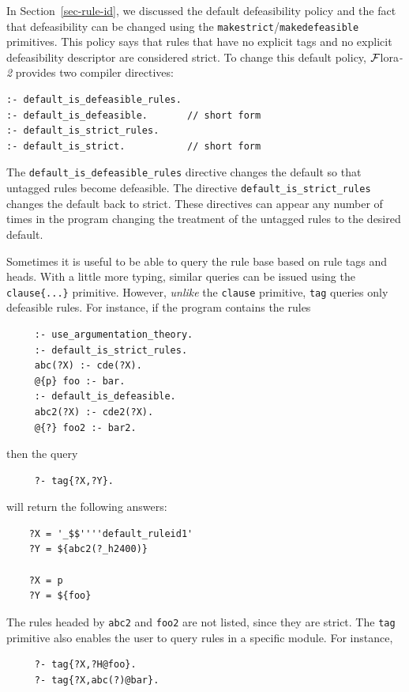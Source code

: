\documentclass[11pt]{article}
\newcommand{\FLORA}{{\mbox{\sc ${\cal F}${lora}\rm\emph{-2}}}\xspace}
\begin{document}
In Section~\ref{sec-rule-id}, we discussed the default
defeasibility policy and the fact that defeasibility can be changed using
the \texttt{makestrict}/\texttt{makedefeasible} primitives.  
This policy says that rules that have no explicit tags and no explicit
defeasibility descriptor are considered strict. To change this default
policy, \FLORA provides two compiler directives:
\begin{verbatim}
:- default_is_defeasible_rules.
:- default_is_defeasible.       // short form
:- default_is_strict_rules.
:- default_is_strict.           // short form
\end{verbatim}
The \verb|default_is_defeasible_rules| directive changes the default so
that untagged rules become defeasible. The directive
\verb|default_is_strict_rules| changes the default back to strict.
These directives can appear any number of times in the program
changing the treatment of the untagged rules to the desired default.

Sometimes it is useful to be able to query the rule base based on rule
tags and heads. With a little more typing, similar queries can be issued
using the {\tt clause\{...\}} primitive. However, 
\emph{unlike} the {\tt clause} primitive, 
{\tt tag}  queries only defeasible rules. For instance, if the program
contains the rules
\begin{verbatim}
     :- use_argumentation_theory.
     :- default_is_strict_rules.
     abc(?X) :- cde(?X).
     @{p} foo :- bar.
     :- default_is_defeasible.
     abc2(?X) :- cde2(?X).
     @{?} foo2 :- bar2.
\end{verbatim}
then the query
\begin{verbatim}
     ?- tag{?X,?Y}.
\end{verbatim}
will return the following answers:
\begin{verbatim}
    ?X = '_$$''''default_ruleid1'
    ?Y = ${abc2(?_h2400)}

    ?X = p
    ?Y = ${foo}
\end{verbatim}
The rules headed by {\tt abc2} and {\tt foo2} are not listed, since they
are strict.  
The {\tt tag} primitive also enables the user to query rules in a specific
module. For instance,
\begin{verbatim}
     ?- tag{?X,?H@foo}.
     ?- tag{?X,abc(?)@bar}.
\end{verbatim}
\end{document}
